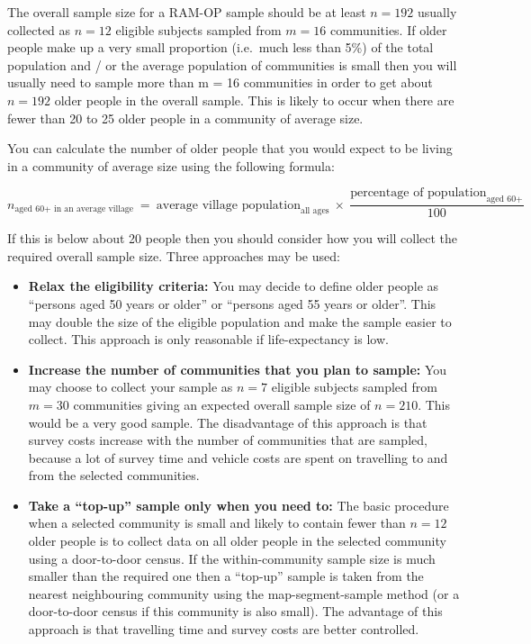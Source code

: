 \documentclass[12pt,a4paper]{book}
\theoremstyle{definition}
\theoremstyle{definition}
\theoremstyle{definition}
\theoremstyle{remark}
\begin{document}
The overall sample size for a RAM-OP sample should be at least
\(n = 192\) usually collected as \(n = 12\) eligible subjects sampled
from \(m = 16\) communities. If older people make up a very small
proportion (i.e.~much less than 5\%) of the total population and / or
the average population of communities is small then you will usually
need to sample more than m = 16 communities in order to get about
\(n = 192\) older people in the overall sample. This is likely to occur
when there are fewer than 20 to 25 older people in a community of
average size.

You can calculate the number of older people that you would expect to be
living in a community of average size using the following formula:

\[n_{\text{aged 60+ in an average village}} ~ = ~ \text{average village population}_{\text{all ages}} ~ \times ~ \frac{\text{percentage of population}_{\text{aged 60+}}}{100}\]

If this is below about 20 people then you should consider how you will
collect the required overall sample size. Three approaches may be used:

\begin{itemize}
\item
  \textbf{Relax the eligibility criteria:} You may decide to define
  older people as ``persons aged 50 years or older'' or ``persons aged
  55 years or older''. This may double the size of the eligible
  population and make the sample easier to collect. This approach is
  only reasonable if life-expectancy is low.
\item
  \textbf{Increase the number of communities that you plan to sample:}
  You may choose to collect your sample as \(n = 7\) eligible subjects
  sampled from \(m = 30\) communities giving an expected overall sample
  size of \(n = 210\). This would be a very good sample. The
  disadvantage of this approach is that survey costs increase with the
  number of communities that are sampled, because a lot of survey time
  and vehicle costs are spent on travelling to and from the selected
  communities.
\item
  \textbf{Take a ``top-up'' sample only when you need to:} The basic
  procedure when a selected community is small and likely to contain
  fewer than \(n = 12\) older people is to collect data on all older
  people in the selected community using a door-to-door census. If the
  within-community sample size is much smaller than the required one
  then a ``top-up'' sample is taken from the nearest neighbouring
  community using the map-segment-sample method (or a door-to-door
  census if this community is also small). The advantage of this
  approach is that travelling time and survey costs are better
  controlled.
\end{itemize}
\end{document}
